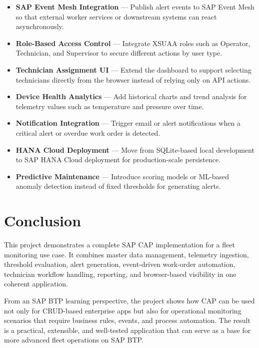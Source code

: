 \documentclass[a4paper,12pt]{article}
\begin{document}
\begin{itemize}[leftmargin=1.5em, itemsep=4pt]
  \item \textbf{SAP Event Mesh Integration} --- Publish alert events to SAP Event Mesh so that external worker services or downstream systems can react asynchronously.

  \item \textbf{Role-Based Access Control} --- Integrate XSUAA roles such as Operator, Technician, and Supervisor to secure different actions by user type.

  \item \textbf{Technician Assignment UI} --- Extend the dashboard to support selecting technicians directly from the browser instead of relying only on API actions.

  \item \textbf{Device Health Analytics} --- Add historical charts and trend analysis for telemetry values such as temperature and pressure over time.

  \item \textbf{Notification Integration} --- Trigger email or alert notifications when a critical alert or overdue work order is detected.

  \item \textbf{HANA Cloud Deployment} --- Move from SQLite-based local development to SAP HANA Cloud deployment for production-scale persistence.

  \item \textbf{Predictive Maintenance} --- Introduce scoring models or ML-based anomaly detection instead of fixed thresholds for generating alerts.
\end{itemize}

\section{Conclusion}

This project demonstrates a complete SAP CAP implementation for a fleet monitoring use case. It combines master data management, telemetry ingestion, threshold evaluation, alert generation, event-driven work-order automation, technician workflow handling, reporting, and browser-based visibility in one coherent application.

From an SAP BTP learning perspective, the project shows how CAP can be used not only for CRUD-based enterprise apps but also for operational monitoring scenarios that require business rules, events, and process automation. The result is a practical, extensible, and well-tested application that can serve as a base for more advanced fleet operations on SAP BTP.
\end{document}
